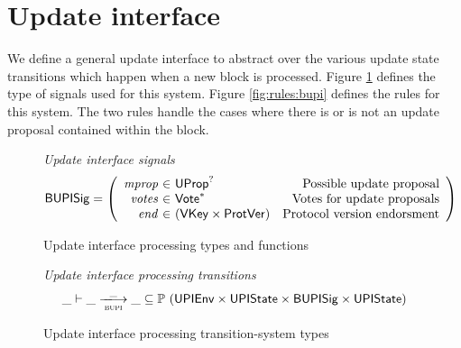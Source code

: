 \documentclass[11pt,a4paper]{article}
\newcommand{\powerset}[1]{\mathbb{P}~#1}
\newcommand{\var}[1]{\mathit{#1}}
\newcommand{\fun}[1]{\mathsf{#1}}
\newcommand{\type}[1]{\mathsf{#1}}
\newcommand{\trans}[2]{\xlongrightarrow[\textsc{#1}]{#2}}
\newcommand{\seqof}[1]{#1^{*}}
\newcommand{\VKey}{\type{VKey}}
\begin{document}
\section{Update interface}

\newcommand{\bupdprop}[1]{\fun{bUpdProp}\ #1}
\newcommand{\bupdvotes}[1]{\fun{bUpdVotes}\ #1}
\newcommand{\bprotver}[1]{\fun{bProtVer}\ #1}
\newcommand{\bendorsment}[1]{\fun{bEndorsment}\ #1}

\newcommand{\Bupisig}{\type{BUPISig}}

\newcommand{\UPIEnv}{\type{UPIEnv}}
\newcommand{\UPIState}{\type{UPIState}}
\newcommand{\UProp}{\type{UProp}}
\newcommand{\Vote}{\ensuremath{\type{Vote}}}
\newcommand{\ProtVer}{\ensuremath{\type{ProtVer}}}

We define a general update interface to abstract over the various update state
transitions which happen when a new block is processed. Figure
\ref{fig:defs:bupi} defines the type of signals used for this system. Figure
\ref{fig:rules:bupi} defines the rules for this system. The two rules handle the
cases where there is or is not an update proposal contained within the block.

\begin{figure}[ht]
  \emph{Update interface signals}
  \begin{equation*}
    \Bupisig =
    \left(
      \begin{array}{r@{~\in~}lr}
        \var{mprop} & \UProp^{?} & \text{Possible update proposal}\\
        \var{votes} & \seqof{\Vote} & \text{Votes for update proposals}\\
        \var{end} & (\VKey \times \ProtVer) & \text{Protocol version endorsment}
      \end{array}
    \right)
  \end{equation*}

  \caption{Update interface processing types and functions}
  \label{fig:defs:bupi}
\end{figure}

\begin{figure}[ht]
  \emph{Update interface processing transitions}
  \begin{equation*}
    \_ \vdash \var{\_} \trans{bupi}{\_} \var{\_} \subseteq
    \powerset (\UPIEnv \times \UPIState \times \Bupisig \times \UPIState)
  \end{equation*}
  \caption{Update interface processing transition-system types}
  \label{fig:ts-types:bupi}
\end{figure}
\end{document}
